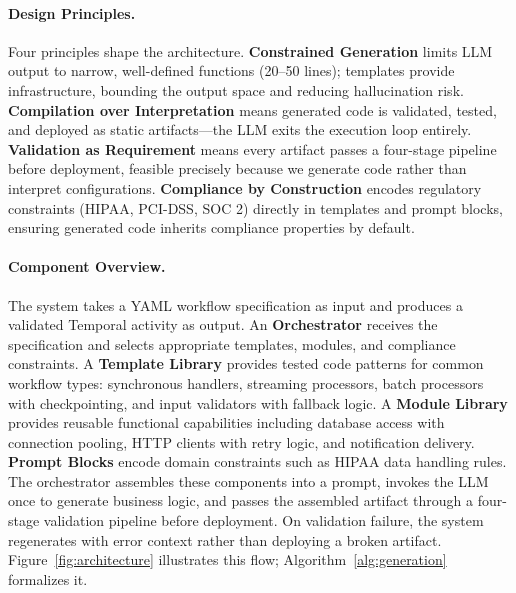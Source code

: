 \documentclass[11pt]{article}
\begin{document}
\paragraph{Design Principles.} Four principles shape the architecture. \textbf{Constrained Generation} limits LLM output to narrow, well-defined functions (20--50 lines); templates provide infrastructure, bounding the output space and reducing hallucination risk. \textbf{Compilation over Interpretation} means generated code is validated, tested, and deployed as static artifacts---the LLM exits the execution loop entirely. \textbf{Validation as Requirement} means every artifact passes a four-stage pipeline before deployment, feasible precisely because we generate code rather than interpret configurations. \textbf{Compliance by Construction} encodes regulatory constraints (HIPAA, PCI-DSS, SOC 2) directly in templates and prompt blocks, ensuring generated code inherits compliance properties by default.

\paragraph{Component Overview.} The system takes a YAML workflow specification as input and produces a validated Temporal activity as output. An \textbf{Orchestrator} receives the specification and selects appropriate templates, modules, and compliance constraints. A \textbf{Template Library} provides tested code patterns for common workflow types: synchronous handlers, streaming processors, batch processors with checkpointing, and input validators with fallback logic. A \textbf{Module Library} provides reusable functional capabilities including database access with connection pooling, HTTP clients with retry logic, and notification delivery. \textbf{Prompt Blocks} encode domain constraints such as HIPAA data handling rules. The orchestrator assembles these components into a prompt, invokes the LLM once to generate business logic, and passes the assembled artifact through a four-stage validation pipeline before deployment. On validation failure, the system regenerates with error context rather than deploying a broken artifact. Figure~\ref{fig:architecture} illustrates this flow; Algorithm~\ref{alg:generation} formalizes it.
\end{document}
